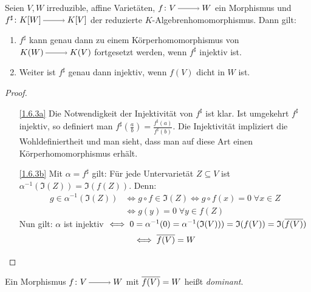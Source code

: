 \documentclass[a4paper,12pt]{scrbook}
\newtheorem{proof}{Beweis}
\def\I{\mathfrak{I}}
\newcommand{\ra}{\raisebox{-1pt}{\tikz{\draw[thin,shorten >=3pt, ->] (0,0) node{\hspace*{-2pt}} -- node{} (1,0);}}\penalty1000\relax}
\def\Bar#1{\ensuremath\overline{#1}}
\begin{document}
\begin{prop}\label{1.6.3}
Seien $V,W$ irreduzible, affine Varietäten, $f \colon V\ra W$ ein Morphismus und $f^{\sharp} \colon K[W]\ra K[V]$ der reduzierte $K$-Algebrenhomomorphismus. Dann gilt:
  \begin{enumerate}
  \item{} $f^{\sharp}$ kann genau dann zu einem Körperhomomorphismus von $K(W)\ra K(V)$ fortgesetzt werden, wenn $f^{\sharp}$ injektiv ist.
  \item{} Weiter ist $f^{\sharp}$ genau dann injektiv, wenn $f(V)$ dicht in $W$ ist.
  \end{enumerate}
\end{prop}

\begin{proof}
  \begin{enumerate}
  \item[\ref{1.6.3a}] Die Notwendigkeit der Injektivität von $f^{\sharp}$ ist klar. Ist umgekehrt $f^{\sharp}$ injektiv, so definiert man $f^{\sharp}(\frac{a}{b})=\frac{f^{\sharp}(a)}{f^{\sharp}(b)}$. Die Injektivität impliziert die Wohldefiniertheit und man sieht, dass man auf diese Art einen     Körperhomomorphismus erhält.
  \item[\ref{1.6.3b}]  Mit $\alpha=f^{\sharp}$ gilt: Für jede Untervarietät $Z \subseteq V$ ist $\alpha^{-1}(\I(Z))=\I(f(Z))$. Denn:
\begin{align*}g \in \alpha^{-1}(\I(Z))& \iff g\circ f \in \I(Z) \iff g \circ f(x)=0 \;\forall x \in Z\\
& \iff g(y)=0 \;\forall y \in f(Z)\end{align*}
Nun gilt: $\alpha$ ist injektiv $\iff 0=\alpha^{-1}(0)=\alpha^{-1}(\I(V)))=\I(f(V))=\I(\Bar{f(V)})$
\[ \iff \Bar{f(V)}=W\]  
  \end{enumerate}
\end{proof}

\begin{dfn}\label{1.6.4}
Ein Morphismus $f \colon V\ra W$ mit $\Bar{f(V)}=W$ heißt \emph{dominant}.
\end{dfn}
\end{document}
